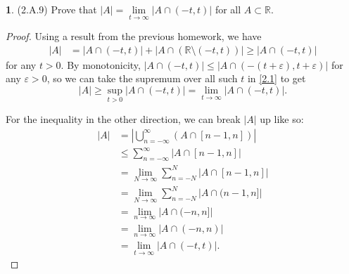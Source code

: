\documentclass[12pt]{article}
\theoremstyle{definition}
\newtheorem{ex}{}
\begin{document}
\begin{ex}
	(2.A.9)
	Prove that $|A| = \lim\limits_{t \to \infty}|A \cap (-t, t)|$ for all $A \subset \mathbb{R}$.
\end{ex}
\begin{proof}
	Using a result from the previous homework, we have \begin{align}
		|A| & = \left| A \cap (-t, t) \right| + \left| A \cap (\mathbb{R} \setminus (-t, t)) \right| \geq |A \cap (-t, t)| \label{2.1}
	\end{align}
	for any $t > 0$.
	By monotonicity, $|A \cap (-t, t)| \leq |A \cap (-(t + \varepsilon), t + \varepsilon)|$ for any $\varepsilon > 0$, so we can take the supremum over all such $t$ in \eqref{2.1} to get \begin{equation*}
		|A| \geq \sup_{t > 0}|A \cap (-t, t)| = \lim_{t \to \infty} |A \cap (-t, t)|.
	\end{equation*}

	For the inequality in the other direction, we can break $|A|$ up like so: \begin{align*}
		|A| & = \left| \bigcup_{n=-\infty}^\infty (A \cap [n-1, n]) \right|        \\
		    & \leq \sum_{n=-\infty}^\infty \left|  A \cap [n-1, n] \right|         \\
		    & = \lim_{N \to \infty} \sum_{n=-N}^N \left| A \cap [n - 1, n] \right| \\
		    & = \lim_{N \to \infty} \sum_{n=-N}^N \left| A \cap (n - 1, n] \right| \\
		    & = \lim_{n \to \infty} \left| A \cap (-n, n] \right|                  \\
		    & = \lim_{n \to \infty} \left| A \cap (-n, n) \right|                  \\
		    & = \lim_{t \to \infty} \left| A \cap (-t, t) \right|.
	\end{align*}
\end{proof}
\end{document}
